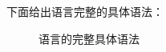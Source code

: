 


下面给出语言完整的具体语法：

\begin{figure}[h]
  \caption{语言的完整具体语法}
  \label{fig:full-con-syntax}
\end{figure}


